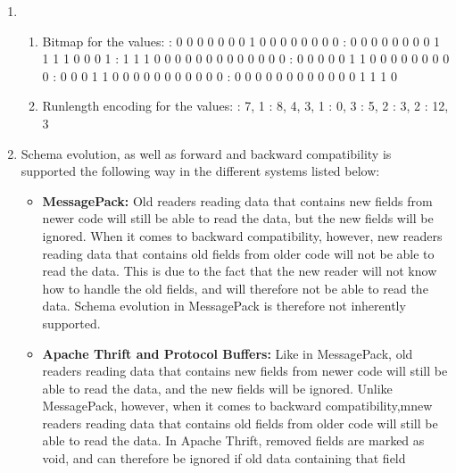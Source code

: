 \begin{enumerate}
    \item 
        \begin{enumerate}
            \item 
                Bitmap for the values:
                : 0 0 0 0 0 0 0 1 0 0 0 0 0 0 0 0
                : 0 0 0 0 0 0 0 0 1 1 1 1 0 0 0 1
                : 1 1 1 0 0 0 0 0 0 0 0 0 0 0 0 0
                : 0 0 0 0 0 1 1 0 0 0 0 0 0 0 0 0
                : 0 0 0 1 1 0 0 0 0 0 0 0 0 0 0 0
                : 0 0 0 0 0 0 0 0 0 0 0 0 1 1 1 0
            \item 
                Runlength encoding for the values:
                : 7, 1
                : 8, 4, 3, 1
                : 0, 3
                : 5, 2
                : 3, 2
                : 12, 3
        \end{enumerate}
    \item
        Schema evolution, as well as forward and backward compatibility is
        supported the following way in the different systems listed below:
        \begin{itemize}
            \item 
                \textbf{MessagePack:} Old readers reading data that contains new 
                fields from newer code will still be able to read the data, but 
                the new fields will be ignored. When it comes to backward 
                compatibility, however, new readers reading data that contains
                old fields from older code will not be able to read the data. 
                This is due to the fact that the new reader will not know how to
                handle the old fields, and will therefore not be able to read
                the data. Schema evolution in MessagePack is therefore not
                inherently supported.
            \item 
                \textbf{Apache Thrift and Protocol Buffers:} Like in 
                MessagePack, old readers reading data that contains new fields
                from newer code will still be able to read the data, and the new
                fields will be ignored. Unlike MessagePack, however, when it 
                comes to backward compatibility,mnew readers reading data that 
                contains old fields from older code will still be able to read 
                the data. In Apache Thrift, removed fields are marked as void, 
                and can therefore be ignored if old data containing that field 

\end{itemize}
\end{enumerate}
